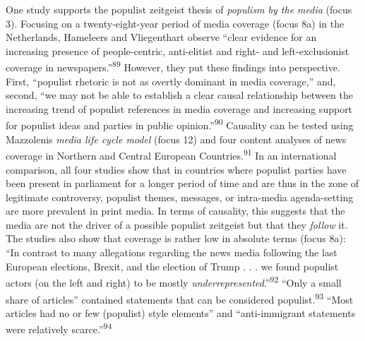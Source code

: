 \documentclass{tufte-handout}
\begin{document}
{{One study supports the populist zeitgeist thesis of \emph{populism by
the media} (focus 3). Focusing on a twenty-eight-year period of media
coverage (focus 8a) in the Netherlands, Hameleers and Vliegenthart
observe ``clear evidence for an increasing presence of people-centric,
anti-elitist and right- and left-exclusionist coverage in
newspapers.''\textsuperscript{89} However, they put these
findings into perspective. First, ``populist rhetoric is not as overtly
dominant in media coverage,'' and, second, ``we may not be able to
establish a clear causal relationship between the increasing trend of
populist references in media coverage and increasing support for
populist ideas and parties in public opinion.''\textsuperscript{90} Causality can be tested using
Mazzoleni\textquotesingle s \emph{media life cycle model} (focus 12) and
four content analyses of news coverage in Northern and Central European
Countries.\textsuperscript{91}
In an international comparison, all four studies show that in countries
where populist parties have been present in parliament for a longer
period of time and are thus in the zone of legitimate controversy,
populist themes, messages, or intra-media agenda-setting are more
prevalent in print media. In terms of causality, this suggests that the
media are not the driver of a possible populist zeitgeist but that they
\emph{follow} it. The studies also show that coverage is rather low in
absolute terms (focus 8a): ``In contrast to many allegations regarding
the news media following the last European elections, Brexit, and the
election of Trump . . . we found populist actors (on the left and right)
to be mostly \emph{underrepresented}.''\textsuperscript{92} ``Only a small share of
articles'' contained statements that can be considered
populist.\textsuperscript{93} ``Most articles had no or few (populist) style
elements'' and ``anti-immigrant statements were relatively
scarce.''\textsuperscript{94}

}}
\end{document}
